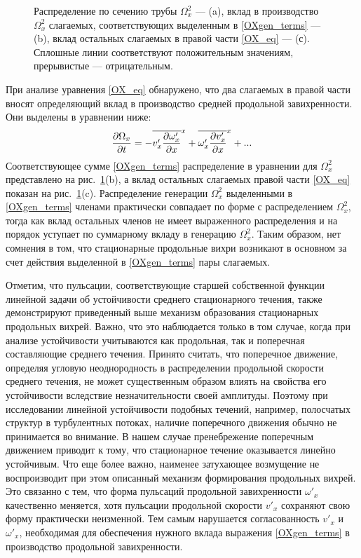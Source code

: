 \begin{figure}
\caption{Распределение по сечению трубы $\Omega_x^2$ --- (a), вклад в производство $\Omega_x^2$ слагаемых, соответствующих выделенным в \eqref{OXgen_terms} --- (b), вклад остальных слагаемых в правой части \eqref{OX_eq} --- (с). Сплошные линии соответствуют положительным значениям, прерывистые --- отрицательным.}
\label{OXgen_pic}
\end{figure}

При анализе уравнения \eqref{OX_eq} обнаружено, что два слагаемых в правой части вносят определяющий вклад в производство средней продольной завихренности. Они выделены в уравнении ниже:
\begin{equation}\label{OXgen_terms}
\frac{\partial \Omega_x}{\partial t} = - \overline{v'_x \frac{\partial \omega'_x}{\partial x}}^x + \overline{ \omega'_x \frac{\partial v'_x}{\partial x} }^x + ... 
\end{equation}
Соответствующее сумме \eqref{OXgen_terms}  распределение в уравнении для $\Omega_x^2$ представлено на рис.~\ref{OXgen_pic}(b), а вклад остальных слагаемых правой части \eqref{OX_eq} показан на рис.~\ref{OXgen_pic}(c). Распределение генерации $\Omega_x^2$ выделенными в \eqref{OXgen_terms} членами практически совпадает по форме с распределением $\Omega_x^2$, тогда как вклад остальных членов не имеет выраженного распределения и на порядок уступает по суммарному вкладу в генерацию $\Omega_x^2$. Таким образом, нет сомнения в том, что стационарные продольные вихри возникают в основном за счет действия выделенной в \eqref{OXgen_terms} пары слагаемых.

Отметим, что пульсации, соответствующие старшей собственной функции линейной задачи об устойчивости среднего стационарного течения, также демонстрируют приведенный выше механизм образования стационарных продольных вихрей. Важно, что это наблюдается только в том случае, когда при анализе устойчивости учитываются как продольная, так и поперечная составляющие среднего течения. Принято считать, что поперечное движение, определяя угловую неоднородность в распределении продольной скорости среднего течения, не может существенным образом влиять на свойства его устойчивости вследствие незначительности своей амплитуды. Поэтому при исследовании линейной устойчивости подобных течений, например, полосчатых структур в турбулентных потоках, наличие поперечного движения обычно не принимается во внимание. В нашем случае пренебрежение поперечным движением приводит к тому, что стационарное течение оказывается линейно устойчивым. Что еще более важно, наименее затухающее возмущение не воспроизводит при этом описанный механизм формирования продольных вихрей. Это связанно с тем, что форма пульсаций продольной завихренности $\omega'_x$ качественно меняется, хотя пульсации продольной скорости $v'_x$ сохраняют свою форму практически неизменной. Тем самым нарушается согласованность  $v'_x$ и $\omega'_x$, необходимая для обеспечения нужного вклада выражения \eqref{OXgen_terms} в производство продольной завихренности.

